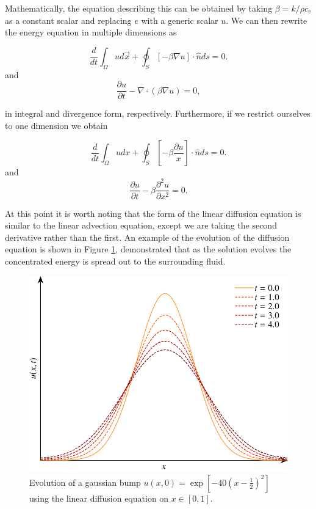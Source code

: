 Mathematically, the equation describing this can be obtained by taking $\beta = k/{\rho c_v}$ as a constant scalar and replacing $e$ with a generic scalar $u$. We can then rewrite the energy equation in multiple dimensions as
\begin{eqBox}
\begin{equation}
\frac{d}{dt}\int_\Omega u d\vec{x} + \oint_S \left[ - \beta \nabla u \right] \cdot \hat{n} ds = 0.
\end{equation}
and
\begin{equation}
\frac{\partial u}{\partial t} - \nabla \cdot (\beta \nabla u) = 0,
\end{equation}
\end{eqBox}
in integral and divergence form, respectively. Furthermore, if we restrict ourselves to one dimension we obtain
\begin{eqBox}
\begin{equation}
\frac{d}{dt}\int_\Omega u dx + \oint_S \left[ - \beta  \frac{\partial u}{x} \right] \cdot \hat{n} ds = 0.
\end{equation}
and
\begin{equation}
\frac{\partial u}{\partial t} - \beta \frac{\partial^2 u}{\partial x^2} = 0.
\end{equation}
\end{eqBox}
At this point it is worth noting that the form of the linear diffusion equation is similar to the linear advection equation, except we are taking the second derivative rather than the first. An example of the evolution of the diffusion equation is shown in Figure \ref{fig:diffusion_equation}, demonstrated that as the solution evolves the concentrated energy is spread out to the surrounding fluid.
\begin{figure}[htbp]
	\centering
	\includegraphics[width=0.65\linewidth]{Pictures/diffusion_equation}
	\caption{Evolution of a gaussian bump $u(x,0)=\exp\left[-40\left(x-\frac{1}{2}\right)^2\right]$ using the linear diffusion equation on $x\in[0,1]$.}
	\label{fig:diffusion_equation}
\end{figure}
